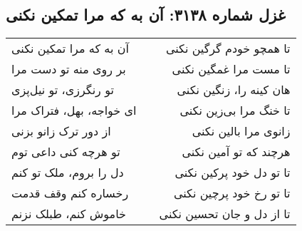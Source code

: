 \begin{center}
\section*{غزل شماره ۳۱۳۸: آن به که مرا تمکین نکنی}
\label{sec:3138}
\begin{longtable}{l p{0.5cm} r}
آن به که مرا تمکین نکنی
&&
تا همچو خودم گرگین نکنی
\\
بر روی منه تو دست مرا
&&
تا مست مرا غمگین نکنی
\\
تو رنگرزی، تو نیل‌پزی
&&
هان کینه را، زنگین نکنی
\\
ای خواجه، بهل، فتراک مرا
&&
تا خنگ مرا بی‌زین نکنی
\\
از دور ترک زانو بزنی
&&
زانوی مرا بالین نکنی
\\
تو هرچه کنی داعی توم
&&
هرچند که تو آمین نکنی
\\
دل را بروم، ملک تو کنم
&&
تا تو دل خود پرکین نکنی
\\
رخساره کنم وقف قدمت
&&
تا تو رخ خود پرچین نکنی
\\
خاموش کنم، طبلک نزنم
&&
تا از دل و جان تحسین نکنی
\\
\end{longtable}
\end{center}
